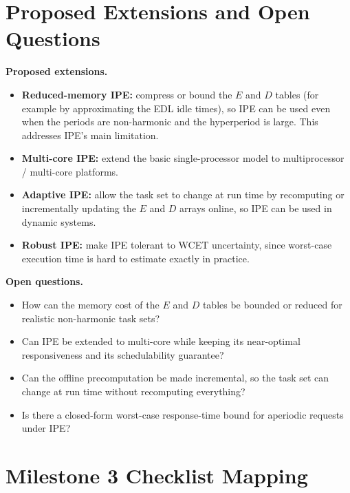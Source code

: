 \documentclass[conference]{IEEEtran}
\begin{document}
\section{Proposed Extensions and Open Questions}

\noindent\textbf{Proposed extensions.}
\begin{itemize}
  \item \textbf{Reduced-memory IPE:} compress or bound the $E$ and $D$ tables
        (for example by approximating the EDL idle times), so IPE can be used
        even when the periods are non-harmonic and the hyperperiod is large.
        This addresses IPE's main limitation.
  \item \textbf{Multi-core IPE:} extend the basic single-processor model to
        multiprocessor / multi-core platforms.
  \item \textbf{Adaptive IPE:} allow the task set to change at run time by
        recomputing or incrementally updating the $E$ and $D$ arrays online, so
        IPE can be used in dynamic systems.
  \item \textbf{Robust IPE:} make IPE tolerant to WCET uncertainty, since
        worst-case execution time is hard to estimate exactly in practice.
\end{itemize}

\noindent\textbf{Open questions.}
\begin{itemize}
  \item How can the memory cost of the $E$ and $D$ tables be bounded or reduced
        for realistic non-harmonic task sets?
  \item Can IPE be extended to multi-core while keeping its near-optimal
        responsiveness and its schedulability guarantee?
  \item Can the offline precomputation be made incremental, so the task set can
        change at run time without recomputing everything?
  \item Is there a closed-form worst-case response-time bound for aperiodic
        requests under IPE?
\end{itemize}

\section{Milestone 3 Checklist Mapping}
\end{document}
